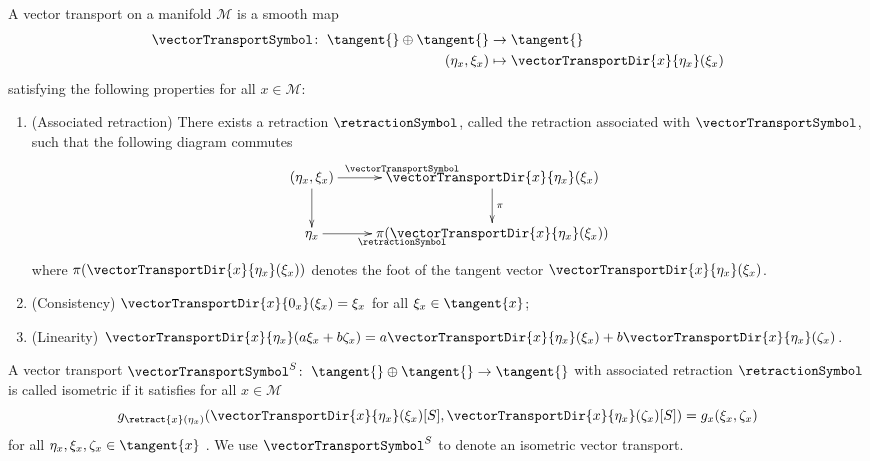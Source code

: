 \begin{definition}\label{VectorTransport}
    A vector transport on a manifold $\mathcal{M}$ is a smooth map 
    \begin{align*}
        \vectorTransportSymbol \colon \; \tangent{} \oplus \tangent{} & \to \tangent{} \\
        (\eta_x, \xi_x) & \mapsto \vectorTransportDir{x}{\eta_x}(\xi_x)
    \end{align*}    
    satisfying the following properties for all $x \in \mathcal{M}$:
    \begin{enumerate}
        \item (Associated retraction) There exists a retraction $\retractionSymbol$, called the retraction associated with $\vectorTransportSymbol$, such that the following diagram commutes \begin{equation*}
        \begin{xy} \xymatrix{(\eta_x, \xi_x) \ar[r]^{\vectorTransportSymbol} \ar[d] & \vectorTransportDir{x}{\eta_x}(\xi_x) \ar[d]^\pi \\ \eta_x \ar[r]_{\retractionSymbol} & \pi (\vectorTransportDir{x}{\eta_x}(\xi_x)) } \end{xy} \end{equation*} where $\pi (\vectorTransportDir{x}{\eta_x}(\xi_x))$ denotes the foot of the tangent vector $\vectorTransportDir{x}{\eta_x}(\xi_x)$. \label{VectorTransport1}
        \item (Consistency) $\vectorTransportDir{x}{0_x}(\xi_x) = \xi_x$ for all $\xi_x \in \tangent{x}$; 
        \item (Linearity) $\vectorTransportDir{x}{\eta_x}(a \xi_x + b \zeta_x) = a \vectorTransportDir{x}{\eta_x}(\xi_x) + b \vectorTransportDir{x}{\eta_x}(\zeta_x)$.
    \end{enumerate}
\end{definition}
A vector transport $\vectorTransportSymbol^S \colon \; \tangent{} \oplus \tangent{} \to \tangent{}$ with associated retraction $\retractionSymbol$ is called isometric if it satisfies for all $x \in \mathcal{M}$
\begin{equation}\label{IsometricVectorTransport}
    g_{\retract{x}(\eta_x)}(\vectorTransportDir{x}{\eta_x}(\xi_x)[S], \vectorTransportDir{x}{\eta_x}(\zeta_x)[S]) = g_x (\xi_x, \zeta_x)
\end{equation}
for all $\eta_x, \xi_x, \zeta_x \in \tangent{x}$ \cite[p.~10]{Huang:2013}. We use $\vectorTransportSymbol^S$ to denote an isometric vector transport. \\

